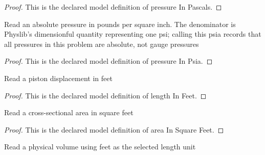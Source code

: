 \begin{proof}
  This is the declared model definition of pressure In Pascals.
\end{proof}
\begin{definition}
  \label{def:physics:phyx-mini-0448:phyxminiproblems-problemphyxmini0448-pressureinpsia}
  Read an absolute pressure in pounds per square inch. The denominator is Physlib's dimensionful quantity representing one psi; calling this psia records that all pressures in this problem are absolute, not gauge pressures
\end{definition}
\begin{proof}
  This is the declared model definition of pressure In Psia.
\end{proof}
\begin{definition}
  \label{def:physics:phyx-mini-0448:phyxminiproblems-problemphyxmini0448-lengthinfeet}
  Read a piston displacement in feet
\end{definition}
\begin{proof}
  This is the declared model definition of length In Feet.
\end{proof}
\begin{definition}
  \label{def:physics:phyx-mini-0448:phyxminiproblems-problemphyxmini0448-areainsquarefeet}
  Read a cross-sectional area in square feet
\end{definition}
\begin{proof}
  This is the declared model definition of area In Square Feet.
\end{proof}
\begin{definition}
  \label{def:physics:phyx-mini-0448:phyxminiproblems-problemphyxmini0448-volumeincubicfeet}
  Read a physical volume using feet as the selected length unit
\end{definition}
